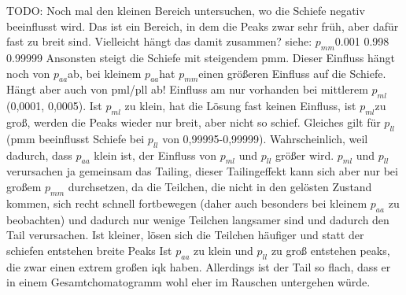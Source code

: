 TODO: Noch mal den kleinen Bereich untersuchen, wo die Schiefe negativ beeinflusst wird. Das ist ein Bereich, in dem die Peaks zwar sehr früh, aber dafür fast zu breit sind. Vielleicht hängt das damit zusammen? siehe: $p_{mm}$0.001 0.998 0.99999
Ansonsten steigt die Schiefe mit steigendem pmm. Dieser Einfluss hängt noch von $p_{aa}$ab, bei kleinem $p_{aa}$hat $p_{mm}$einen größeren Einfluss auf die Schiefe. Hängt aber auch von pml/pll ab! 
Einfluss am nur vorhanden bei mittlerem $p_{ml}$ (0,0001, 0,0005). Ist $p_{ml}$ zu klein, hat die Lösung fast keinen Einfluss, ist $p_{ml}$zu groß, werden die Peaks wieder nur breit, aber nicht so schief. Gleiches gilt für $p_{ll}$ (pmm beeinflusst Schiefe bei $p_{ll}$ von 0,99995-0,99999).
Wahrscheinlich, weil dadurch, dass $p_{aa}$ klein ist, der Einfluss von $p_{ml}$ und $p_{ll}$ größer wird. $p_{ml}$ und $p_{ll}$ verursachen ja gemeinsam das Tailing, dieser Tailingeffekt kann sich aber nur bei großem $p_{mm}$ durchsetzen, da die Teilchen, die nicht in den gelösten Zustand kommen, sich recht schnell fortbewegen (daher auch besonders bei kleinem $p_{aa}$ zu beobachten) und dadurch nur wenige Teilchen langsamer sind und dadurch den Tail verursachen. Ist kleiner, lösen sich die Teilchen häufiger und statt der schiefen entstehen breite Peaks
Ist $p_{aa}$ zu klein und $p_{ll}$ zu groß entstehen peaks, die zwar einen extrem großen iqk haben. Allerdings ist der Tail so flach, dass er in einem Gesamtchomatogramm wohl eher im Rauschen untergehen würde.


